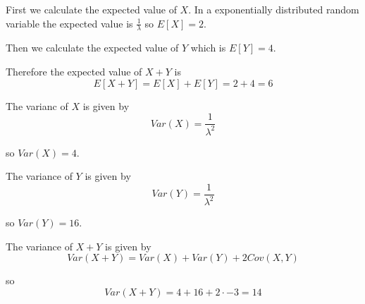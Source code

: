 First we calculate the expected value of $X$. In a exponentially distributed random variable the expected value is $\frac{1}{\lambda}$ so $E[X] = 2$.

Then we calculate the expected value of $Y$ which is $E[Y] = 4$.

Therefore the expected value of $X+Y$ is
\[
	E[X+Y] = E[X] + E[Y] = 2 + 4 = 6
\]

The varianc of $X$ is given by
\[
	Var(X) = \frac{1}{\lambda^2}
\]

so $Var(X) = 4$.

The variance of $Y$ is given by
\[
	Var(Y) = \frac{1}{\lambda^2}
\]

so $Var(Y) = 16$.

The variance of $X+Y$ is given by
\[
	Var(X+Y) = Var(X) + Var(Y) + 2Cov(X,Y)
\]

so
\[
	Var(X+Y) = 4 + 16 + 2\cdot -3 = 14
\]
